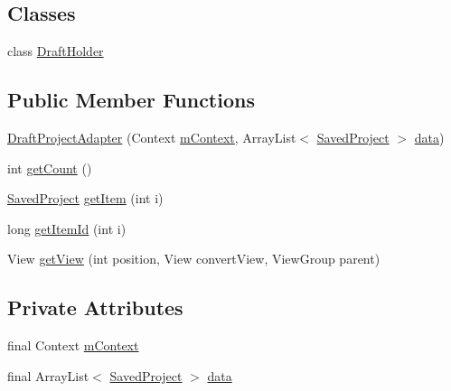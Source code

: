 \subsection*{Classes}
\begin{DoxyCompactItemize}
\item 
class \hyperlink{classorg_1_1buildmlearn_1_1toolkit_1_1adapter_1_1DraftProjectAdapter_1_1DraftHolder}{Draft\+Holder}
\end{DoxyCompactItemize}
\subsection*{Public Member Functions}
\begin{DoxyCompactItemize}
\item 
\hyperlink{classorg_1_1buildmlearn_1_1toolkit_1_1adapter_1_1DraftProjectAdapter_abda883bc5eb32802d83d0de23d808a3f}{Draft\+Project\+Adapter} (Context \hyperlink{classorg_1_1buildmlearn_1_1toolkit_1_1adapter_1_1DraftProjectAdapter_ae60c70f935a9fb5948e78655260c01c8}{m\+Context}, Array\+List$<$ \hyperlink{classorg_1_1buildmlearn_1_1toolkit_1_1model_1_1SavedProject}{Saved\+Project} $>$ \hyperlink{classorg_1_1buildmlearn_1_1toolkit_1_1adapter_1_1DraftProjectAdapter_a91aa873b448d0a53bab535f76a3d135e}{data})
\item 
int \hyperlink{classorg_1_1buildmlearn_1_1toolkit_1_1adapter_1_1DraftProjectAdapter_a66c1eb72c04b72c0844c9eaa165cf1a7}{get\+Count} ()
\item 
\hyperlink{classorg_1_1buildmlearn_1_1toolkit_1_1model_1_1SavedProject}{Saved\+Project} \hyperlink{classorg_1_1buildmlearn_1_1toolkit_1_1adapter_1_1DraftProjectAdapter_a451d58d7df47ae196e14a896fc581c67}{get\+Item} (int i)
\item 
long \hyperlink{classorg_1_1buildmlearn_1_1toolkit_1_1adapter_1_1DraftProjectAdapter_afef1ea9c758476f500e2ac1a48a6a4fc}{get\+Item\+Id} (int i)
\item 
View \hyperlink{classorg_1_1buildmlearn_1_1toolkit_1_1adapter_1_1DraftProjectAdapter_a545c21ce80c15607c0e8b3660f9ff66f}{get\+View} (int position, View convert\+View, View\+Group parent)
\end{DoxyCompactItemize}
\subsection*{Private Attributes}
\begin{DoxyCompactItemize}
\item 
final Context \hyperlink{classorg_1_1buildmlearn_1_1toolkit_1_1adapter_1_1DraftProjectAdapter_ae60c70f935a9fb5948e78655260c01c8}{m\+Context}
\item 
final Array\+List$<$ \hyperlink{classorg_1_1buildmlearn_1_1toolkit_1_1model_1_1SavedProject}{Saved\+Project} $>$ \hyperlink{classorg_1_1buildmlearn_1_1toolkit_1_1adapter_1_1DraftProjectAdapter_a91aa873b448d0a53bab535f76a3d135e}{data}
\end{DoxyCompactItemize}


